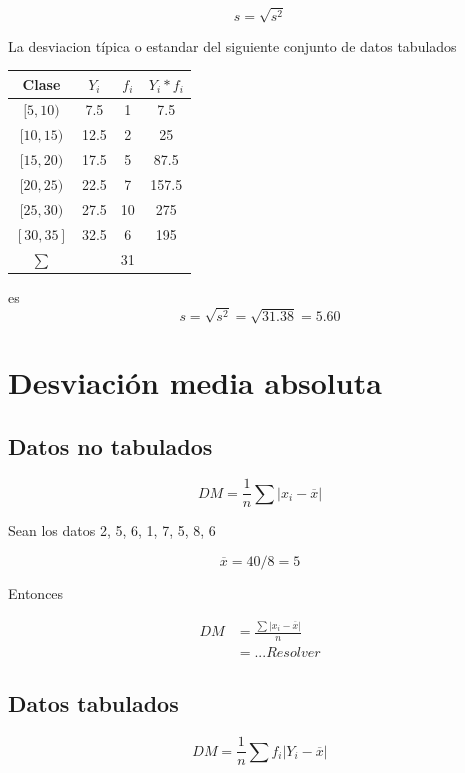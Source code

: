 \documentclass[
  11pt,
]{krantz}
\theoremstyle{definition}
\theoremstyle{definition}
\theoremstyle{definition}
\theoremstyle{definition}
\theoremstyle{remark}
\begin{document}
\[s=\sqrt{s^2}\]

La desviacion típica o estandar del siguiente conjunto de datos tabulados

\begin{longtable}[]{@{}cccc@{}}
\toprule
Clase & \(Y_i\) & \(f_i\) & \(Y_i*f_i\) \\
\midrule
\endhead
\([5,10)\) & 7.5 & 1 & 7.5 \\
\([10,15)\) & 12.5 & 2 & 25 \\
\([15,20)\) & 17.5 & 5 & 87.5 \\
\([20,25)\) & 22.5 & 7 & 157.5 \\
\([25,30)\) & 27.5 & 10 & 275 \\
\([30,35]\) & 32.5 & 6 & 195 \\
\(\sum\) & & 31 & \\
\bottomrule
\end{longtable}

es \[s=\sqrt{s^2}=\sqrt{31.38}=5.60\]

\hypertarget{desviaciuxf3n-media-absoluta}{%
\section{Desviación media absoluta}\label{desviaciuxf3n-media-absoluta}}

\hypertarget{datos-no-tabulados-1}{%
\subsection{Datos no tabulados}\label{datos-no-tabulados-1}}

\[DM=\frac{1}{n}\sum \left\vert x_i-\overline{x}\right\vert\]

Sean los datos 2, 5, 6, 1, 7, 5, 8, 6

\[\overline{x}=40/8=5\]

Entonces

\[
\begin{aligned}
DM&=\frac{\sum\left\vert x_i-\overline{x}\right \vert}{n}\\
&=... Resolver
\end{aligned}
\]

\hypertarget{datos-tabulados-1}{%
\subsection{Datos tabulados}\label{datos-tabulados-1}}

\[DM=\frac{1}{n}\sum f_i \left \vert Y_i-\overline{x}\right\vert\]
\end{document}
